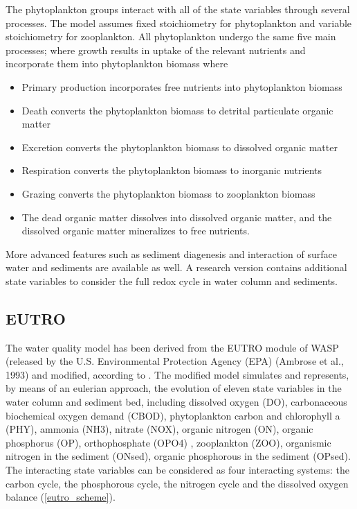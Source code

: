 The phytoplankton groups interact with all of the state variables through several processes. The model assumes fixed stoichiometry for phytoplankton and variable stoichiometry for zooplankton. All phytoplankton undergo the same five main processes; where growth results in uptake of the relevant nutrients and incorporate them into phytoplankton biomass where
\begin{itemize}
\item Primary production incorporates free nutrients into phytoplankton biomass
\item Death converts the phytoplankton biomass to detrital particulate organic matter 
\item Excretion converts the phytoplankton biomass to dissolved organic matter
\item Respiration converts the phytoplankton biomass to inorganic nutrients
\item Grazing converts the phytoplankton biomass to zooplankton biomass
\item The dead organic matter dissolves into dissolved organic matter, and the dissolved organic matter mineralizes to free nutrients.
\end{itemize}

More advanced features such as sediment diagenesis and interaction of surface water and sediments are available as well. A research version contains additional state variables to consider the full redox cycle in water column and sediments.

\subsection{EUTRO}
The water quality model has been derived from the EUTRO module of WASP (released by the U.S. Environmental Protection Agency (EPA) (Ambrose et al., 1993) and modified, according to \cite{Umgie2003, Canu2003, Aveytua2020}.
The modified model simulates and represents, by means of an eulerian approach, the evolution of eleven state variables in the water column and sediment bed, including dissolved oxygen (DO), carbonaceous biochemical oxygen demand (CBOD), phytoplankton carbon and chlorophyll a (PHY), ammonia (NH3), nitrate (NOX), organic nitrogen (ON), organic phosphorus (OP), orthophosphate (OPO4) , zooplankton (ZOO), organismic nitrogen in the sediment (ONsed), organic phosphorous in the sediment (OPsed). The interacting state variables can be considered as four interacting systems: the carbon cycle, the phosphorous cycle, the nitrogen cycle and the dissolved oxygen balance (\Fig \ref{eutro_scheme}).


